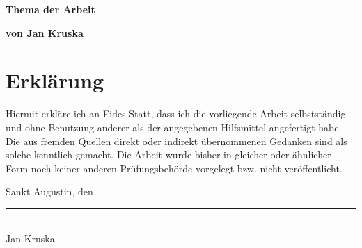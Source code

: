 \documentclass[a4paper]{book}
\def\autor{Jan Kruska}
\def\datum{\date}
\begin{document}
\begin{titlepage}
\begin{center}
    \vspace{2.2cm}
    \renewcommand{\baselinestretch}{1.2}\normalsize
    \begin{huge}
      \textbf{Thema der Arbeit\\}
    \end{huge}
    \renewcommand{\baselinestretch}{1.5}\normalsize
    \vspace{0.7cm}
    
    
    \begin{Large}\textbf{von \autor\ \\}
    \end{Large}
  \end{center}
  
  \vspace{5.0cm}
  
\end{titlepage}



\cleardoublepage
\section*{Erklärung}

Hiermit erkläre ich an Eides Statt, dass ich die vorliegende Arbeit
selbstständig und ohne Benutzung anderer als der angegebenen
Hilfsmittel angefertigt habe. Die aus fremden Quellen direkt oder
indirekt übernommenen Gedanken sind als solche kenntlich gemacht.  Die
Arbeit wurde bisher in gleicher oder ähnlicher Form noch keiner
anderen Prüfungsbehörde vorgelegt bzw. nicht veröffentlicht.

\vspace{1cm}
Sankt Augustin, den \datum\
\vspace{2cm}


\rule{10cm}{0.1mm} \\
\autor\
\end{document}
